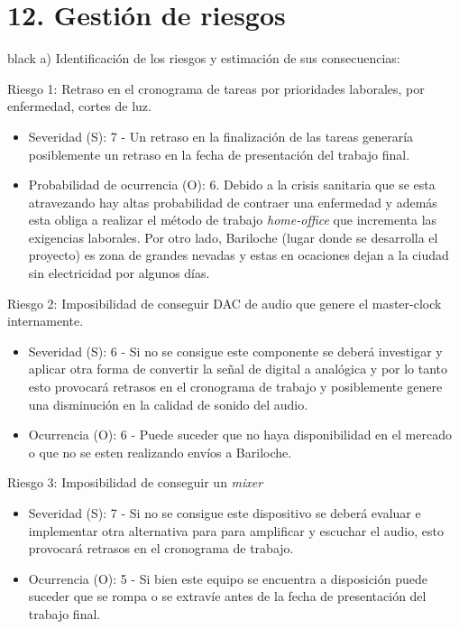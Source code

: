\documentclass[11pt]{charter}
\begin{document}
\section{12. Gestión de riesgos}
\label{sec:riesgos}

\begin{consigna}{black}
a) Identificación de los riesgos y estimación de sus consecuencias:
 
Riesgo 1: Retraso en el cronograma de tareas por prioridades laborales, por enfermedad, cortes de luz.
\begin{itemize}
\item Severidad (S): 7 - Un retraso en la finalización de las tareas generaría posiblemente un retraso en la fecha de presentación del trabajo final.
\item Probabilidad de ocurrencia (O): 6. Debido a la crisis sanitaria que se esta atravezando hay altas probabilidad de contraer una enfermedad y además esta obliga a realizar el método de trabajo \textit{home-office} que incrementa las exigencias laborales. Por otro lado, Bariloche (lugar donde se desarrolla el proyecto) es zona de grandes nevadas y estas en ocaciones dejan a la ciudad sin electricidad por algunos días.
\end{itemize}   

Riesgo 2: Imposibilidad de conseguir DAC  de audio que genere el master-clock internamente.
\begin{itemize}
\item Severidad (S): 6 - Si no se consigue este componente se deberá investigar y aplicar otra forma de convertir la señal de digital a analógica y por lo tanto esto provocará retrasos en el cronograma de trabajo y posiblemente genere una disminución en la calidad de sonido del audio.
\item Ocurrencia (O): 6 -  Puede suceder que no haya disponibilidad en el mercado o que no se esten realizando envíos a Bariloche. 
\end{itemize}

Riesgo 3: Imposibilidad de conseguir un \textit{mixer}
\begin{itemize}
\item Severidad (S): 7 - Si no se consigue este dispositivo se deberá evaluar e implementar otra alternativa para para amplificar y escuchar el audio, esto provocará retrasos en el cronograma de trabajo. 
\item Ocurrencia (O): 5 - Si bien este equipo se encuentra a disposición puede suceder que se rompa o se extravíe antes de la fecha de presentación del trabajo final.
\end{itemize}


\end{consigna}
\end{document}
